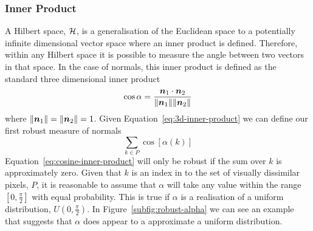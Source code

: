 \subsubsection{Inner Product}\label{subsubsec:inner-product-normals}
A Hilbert space, $\mathcal{H}$, is a generalisation of the Euclidean space to a potentially infinite dimensional vector space where an inner product is defined. Therefore, within any Hilbert space it is possible to measure the angle between two vectors in that space. In the case of normals, this inner product is defined as the standard three dimensional inner product
\begin{equation}\label{eq:3d-inner-product}
    \cos \alpha = \frac{\boldsymbol{n}_1 \cdot \boldsymbol{n}_2}{\norm{\boldsymbol{n}_1} \norm{\boldsymbol{n}_2}}
\end{equation}
where $\lVert \boldsymbol{n}_1 \rVert = \lVert \boldsymbol{n}_2 \rVert = 1$. Given Equation~\ref{eq:3d-inner-product} we can define our first robust measure of normals
\begin{equation}\label{eq:cosine-inner-product}
    \sum_{k \in P} \cos[\alpha(k)]
\end{equation}
Equation~\ref{eq:cosine-inner-product} will only be robust if the sum over $k$ is approximately zero. Given that $k$ is an index in to the set of visually dissimilar pixels, $P$, it is reasonable to assume that $\alpha$ will take any value within the range $[0, \frac{\pi}{2}]$ with equal probability. This is true if $\alpha$ is a realisation of a uniform distribution, $U(0, \frac{\pi}{2})$. In Figure~\ref{subfig:robust-alpha} we can see an example that suggests that $\alpha$ does appear to a approximate a uniform distribution.
